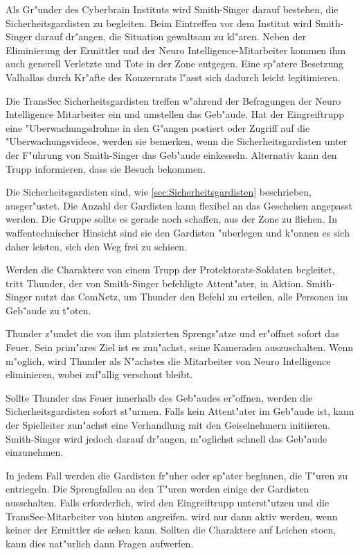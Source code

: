 Als Gr"under des Cyberbrain Instituts wird Smith-Singer darauf bestehen, die Sicherheitsgardisten zu begleiten. Beim Eintreffen vor dem Institut wird Smith-Singer darauf dr"angen, die Situation gewaltsam zu kl"aren. Neben der Eliminierung der Ermittler und der Neuro Intelligence-Mitarbeiter kommen ihm auch generell Verletzte und Tote in der Zone entgegen. Eine sp"atere Besetzung Valhallas durch Kr"afte des Konzernrats l"asst sich dadurch leicht legitimieren.

Die TransSec Sicherheitsgardisten treffen w"ahrend der Befragungen der Neuro Intelligence Mitarbeiter ein und umstellen das Geb"aude. Hat der Eingreiftrupp eine "Uberwachungsdrohne in den G"angen postiert oder Zugriff auf die "Uberwachungsvideos, werden sie bemerken, wenn die Sicherheitsgardisten unter der F"uhrung von Smith-Singer das Geb"aude einkesseln. Alternativ kann \xl{} den Trupp informieren, dass sie Besuch bekommen.

Die Sicherheitsgardisten sind, wie \cref{sec:Sicherheitsgardisten} beschrieben, ausger"ustet. Die Anzahl der Gardisten kann flexibel an das Geschehen angepasst werden. Die Gruppe sollte es gerade noch schaffen, aus der Zone zu fliehen. In waffentechnischer Hinsicht sind sie den Gardisten "uberlegen und k"onnen es sich daher leisten, sich den Weg frei zu schie\3en.

Werden die Charaktere von einem Trupp der Protektorats-Soldaten begleitet, tritt Thunder, der von Smith-Singer befehligte Attent"ater, in Aktion. Smith-Singer nutzt das ComNetz, um Thunder den Befehl zu erteilen, alle Personen im Geb"aude zu t"oten.

Thunder z"undet die von ihm platzierten Sprengs"atze und er"offnet sofort das Feuer. Sein prim"ares Ziel ist es zun"achst, seine Kameraden auszuschalten. Wenn m"oglich, wird Thunder als N"achstes die Mitarbeiter von Neuro Intelligence eliminieren, wobei \ml{} zuf"allig verschont bleibt.

Sollte Thunder das Feuer innerhalb des Geb"audes er"offnen, werden die Sicherheitsgardisten sofort st"urmen. Falls kein Attent"ater im Geb"aude ist, kann der Spielleiter zun"achst eine Verhandlung mit den Geiselnehmern initiieren. Smith-Singer wird jedoch darauf dr"angen, m"oglichst schnell das Geb"aude einzunehmen.

In jedem Fall werden die Gardisten fr"uher oder sp"ater beginnen, die T"uren zu entriegeln. Die Sprengfallen an den T"uren werden einige der Gardisten ausschalten. Falls erforderlich, wird \xl{} den Eingreiftrupp unterst"utzen und die TransSec-Mitarbeiter von hinten angreifen. \xl{} wird nur dann aktiv werden, wenn keiner der Ermittler sie sehen kann. Sollten die Charaktere auf Leichen sto\3en, kann dies nat"urlich  dann Fragen aufwerfen.

